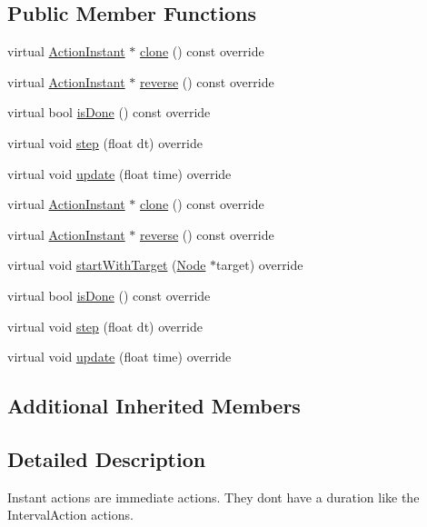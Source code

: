 \subsection*{Public Member Functions}
\begin{DoxyCompactItemize}
\item 
virtual \hyperlink{classActionInstant}{Action\+Instant} $\ast$ \hyperlink{classActionInstant_adb76fc6f006098109e8256210cbd8cc0}{clone} () const override
\item 
virtual \hyperlink{classActionInstant}{Action\+Instant} $\ast$ \hyperlink{classActionInstant_aeb1870802c509e1f4111c863a28e9262}{reverse} () const override
\item 
virtual bool \hyperlink{classActionInstant_a3979d0556340173cdf58111665a96afd}{is\+Done} () const override
\item 
virtual void \hyperlink{classActionInstant_ab6c8b1bb612803681a2727a1d5d7b5df}{step} (float dt) override
\item 
virtual void \hyperlink{classActionInstant_a59875bf08cd1f58c0c8c6693ac540ade}{update} (float time) override
\item 
virtual \hyperlink{classActionInstant}{Action\+Instant} $\ast$ \hyperlink{classActionInstant_adb76fc6f006098109e8256210cbd8cc0}{clone} () const override
\item 
virtual \hyperlink{classActionInstant}{Action\+Instant} $\ast$ \hyperlink{classActionInstant_aeb1870802c509e1f4111c863a28e9262}{reverse} () const override
\item 
virtual void \hyperlink{classActionInstant_a47cff49ef73e126e5e9d6c26872a9e23}{start\+With\+Target} (\hyperlink{classNode}{Node} $\ast$target) override
\item 
virtual bool \hyperlink{classActionInstant_a9d54eff7c6e29764843fbbb965643643}{is\+Done} () const override
\item 
virtual void \hyperlink{classActionInstant_ae1478ff1e34788247a0092dbd431c825}{step} (float dt) override
\item 
virtual void \hyperlink{classActionInstant_ab1da09b6408b3477b7ff75be8e58de0d}{update} (float time) override
\end{DoxyCompactItemize}
\subsection*{Additional Inherited Members}


\subsection{Detailed Description}
Instant actions are immediate actions. They don\textquotesingle{}t have a duration like the Interval\+Action actions. 


